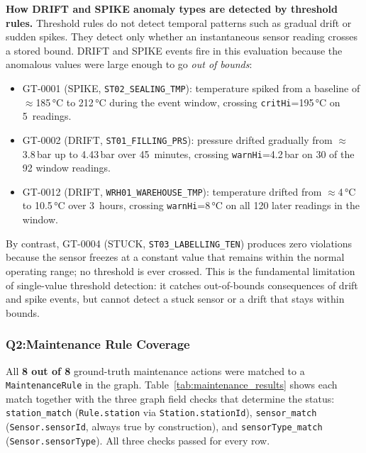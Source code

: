﻿\documentclass[11pt]{article}
\begin{document}
\begin{table}[H]
\begin{minipage}{\textwidth}
\medskip
\textbf{How DRIFT and SPIKE anomaly types are detected by threshold rules.}
Threshold rules do not detect temporal patterns such as gradual drift or
sudden spikes.  They detect only whether an instantaneous sensor reading
crosses a stored bound.  DRIFT and SPIKE events fire in this evaluation
because the anomalous values were large enough to go \emph{out of bounds}:
\begin{itemize}[leftmargin=1.2em,itemsep=1pt,topsep=2pt]
  \item GT-0001 (SPIKE, \texttt{ST02\_SEALING\_TMP}): temperature spiked
    from a baseline of $\approx$185\,°C to 212\,°C during the event
    window, crossing \texttt{critHi}=195\,°C on 5~readings.
  \item GT-0002 (DRIFT, \texttt{ST01\_FILLING\_PRS}): pressure drifted
    gradually from $\approx$3.8\,bar up to 4.43\,bar over 45~minutes,
    crossing \texttt{warnHi}=4.2\,bar on 30 of the 92 window readings.
  \item GT-0012 (DRIFT, \texttt{WRH01\_WAREHOUSE\_TMP}): temperature
    drifted from $\approx$4\,°C to 10.5\,°C over 3~hours, crossing
    \texttt{warnHi}=8\,°C on all 120 later readings in the window.
\end{itemize}
By contrast, GT-0004 (STUCK, \texttt{ST03\_LABELLING\_TEN}) produces
zero violations because the sensor freezes at a constant value that
remains within the normal operating range; no threshold is ever crossed.
This is the fundamental limitation of single-value threshold detection:
it catches out-of-bounds consequences of drift and spike events, but
cannot detect a stuck sensor or a drift that stays within bounds.
\end{minipage}
\end{table}

\subsubsection{Q2:Maintenance Rule Coverage}

All \textbf{8 out of 8} ground-truth maintenance actions were matched to a
\texttt{MaintenanceRule} in the graph.
Table~\ref{tab:maintenance_results} shows each match together with the three
graph field checks that determine the status: \texttt{station\_match}
(\texttt{Rule.station} via \texttt{Station.stationId}), \texttt{sensor\_match}
(\texttt{Sensor.sensorId}, always true by construction), and
\texttt{sensorType\_match} (\texttt{Sensor.sensorType}).
All three checks passed for every row.
\end{document}
